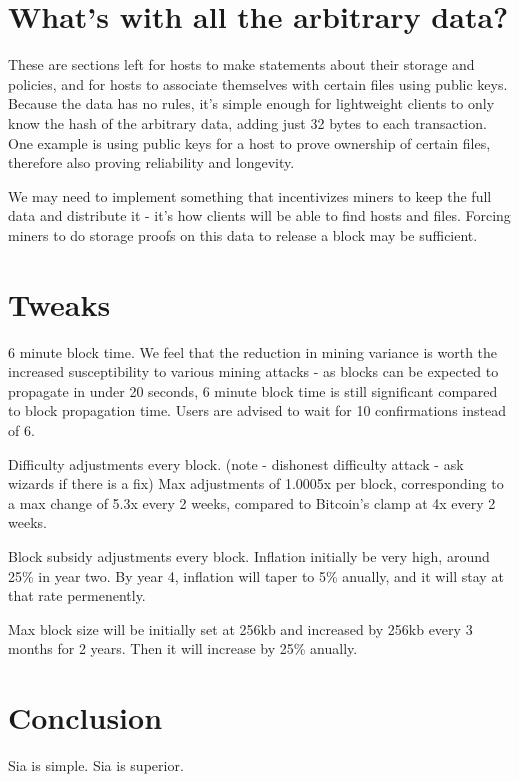 \documentclass[twocolumn]{article}
\begin{document}
\section{What's with all the arbitrary data?}
These are sections left for hosts to make statements about their storage and policies, and for hosts to associate themselves with certain files using public keys.
Because the data has no rules, it's simple enough for lightweight clients to only know the hash of the arbitrary data, adding just 32 bytes to each transaction.
One example is using public keys for a host to prove ownership of certain files, therefore also proving reliability and longevity.

We may need to implement something that incentivizes miners to keep the full data and distribute it - it's how clients will be able to find hosts and files.
Forcing miners to do storage proofs on this data to release a block may be sufficient.

\section{Tweaks}
6 minute block time. We feel that the reduction in mining variance is worth the increased susceptibility to various mining attacks - as blocks can be expected to propagate in under 20 seconds, 6 minute block time is still significant compared to block propagation time.
Users are advised to wait for 10 confirmations instead of 6.

Difficulty adjustments every block. (note - dishonest difficulty attack - ask wizards if there is a fix)
Max adjustments of 1.0005x per block, corresponding to a max change of 5.3x every 2 weeks, compared to Bitcoin's clamp at 4x every 2 weeks.

Block subsidy adjustments every block.
Inflation initially be very high, around 25\% in year two.
By year 4, inflation will taper to 5\% anually, and it will stay at that rate permenently.

Max block size will be initially set at 256kb and increased by 256kb every 3 months for 2 years.
Then it will increase by 25\% anually.

\section{Conclusion}
Sia is simple. Sia is superior.



\end{document}
